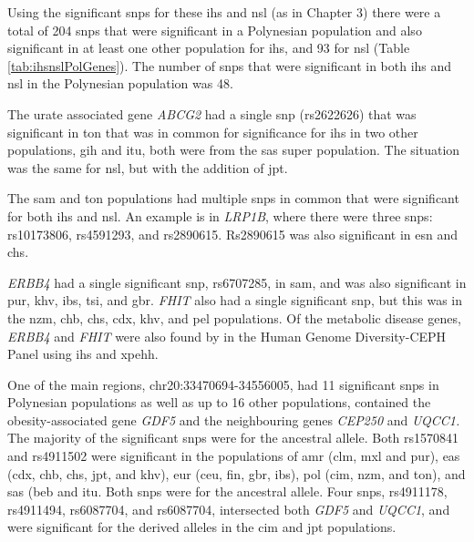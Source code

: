 \documentclass[twoside,openright]{report}
\begin{document}
Using the significant \glspl{snp} for these \gls{ihs} and \gls{nsl} (as
in Chapter 3) there were a total of 204 \glspl{snp} that were
significant in a Polynesian population and also significant in at least
one other population for \gls{ihs}, and 93 for \gls{nsl} (Table
\ref{tab:ihsnslPolGenes}). The number of \glspl{snp} that were
significant in both \gls{ihs} and \gls{nsl} in the Polynesian population
was 48.

The urate associated gene \emph{ABCG2} had a single \gls{snp}
(rs2622626) that was significant in \gls{ton} that was in common for
significance for \gls{ihs} in two other populations, \gls{gih} and
\gls{itu}, both were from the \gls{sas} super population. The situation
was the same for \gls{nsl}, but with the addition of \gls{jpt}.

The \gls{sam} and \gls{ton} populations had multiple \glspl{snp} in
common that were significant for both \gls{ihs} and \gls{nsl}. An
example is in \emph{LRP1B}, where there were three \glspl{snp}:
rs10173806, rs4591293, and rs2890615. Rs2890615 was also significant in
\gls{esn} and \gls{chs}.

\emph{ERBB4} had a single significant \gls{snp}, rs6707285, in
\gls{sam}, and was also significant in \gls{pur}, \gls{khv}, \gls{ibs},
\gls{tsi}, and \gls{gbr}. \emph{FHIT} also had a single significant
\gls{snp}, but this was in the \gls{nzm}, \gls{chb}, \gls{chs},
\gls{cdx}, \gls{khv}, and \gls{pel} populations. Of the metabolic
disease genes, \emph{ERBB4} and \emph{FHIT} were also found by
\citet{pickrell2009signals} in the Human Genome Diversity-CEPH Panel
using \gls{ihs} and \gls{xpehh}.

One of the main regions, chr20:33470694-34556005, had 11 significant
\glspl{snp} in Polynesian populations as well as up to 16 other
populations, contained the obesity-associated gene \emph{GDF5} and the
neighbouring genes \emph{CEP250} and \emph{UQCC1.} The majority of the
significant \glspl{snp} were for the ancestral allele. Both rs1570841
and rs4911502 were significant in the populations of \gls{amr}
(\gls{clm}, \gls{mxl} and \gls{pur}), \gls{eas} (\gls{cdx}, \gls{chb},
\gls{chs}, \gls{jpt}, and \gls{khv}), \gls{eur} (\gls{ceu}, \gls{fin},
\gls{gbr}, \gls{ibs}), \gls{pol} (\gls{cim}, \gls{nzm}, and \gls{ton}),
and \gls{sas} (\gls{beb} and \gls{itu}. Both \glspl{snp} were for the
ancestral allele. Four \glspl{snp}, rs4911178, rs4911494, rs6087704, and
rs6087704, intersected both \emph{GDF5} and \emph{UQCC1}, and were
significant for the derived alleles in the \gls{cim} and \gls{jpt}
populations.
\end{document}
